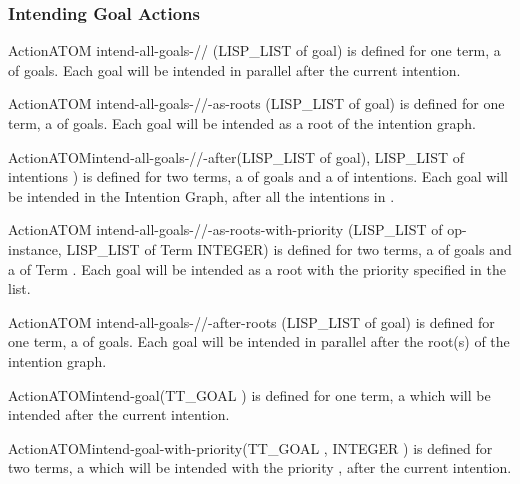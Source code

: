 \subsubsection{Intending Goal Actions}

\begin{typeefa}{Action}{ATOM} {intend-all-goals-//} {(LISP\_LIST of goal)}
is defined for one term, a  of goals. Each goal will be intended
in parallel after the current intention.
\end{typeefa}

\begin{typeefa}{Action}{ATOM} {intend-all-goals-//-as-roots} {(LISP\_LIST of
goal)}
is defined for one term, a  of goals.
Each goal will be intended as a root of the intention graph.
\end{typeefa}

\begin{typeefa}{Action}{ATOM}{intend-all-goals-//-after}{(LISP\_LIST of goal),
LISP\_LIST of intentions )} is defined for two terms, a  of
goals and  a  of intentions. Each goal will be intended in
the Intention Graph, after all the intentions in .
\end{typeefa}

\begin{typeefa}{Action}{ATOM} {intend-all-goals-//-as-roots-with-priority}
{(LISP\_LIST of op-instance, LISP\_LIST of Term INTEGER)} is defined for two
terms, a  of goals and a  of Term .  Each goal will be
intended as a root with the priority specified in the  list.
\end{typeefa}

\begin{typeefa}{Action}{ATOM} {intend-all-goals-//-after-roots} {(LISP\_LIST of
goal)} is defined for one term, a  of goals. Each goal will be intended
in parallel after the root(s) of the intention graph.
\end{typeefa}

\begin{typeefa}{Action}{ATOM}{intend-goal}{(TT\_GOAL )}
is defined for one term, a   which will be
intended after the current intention.
\end{typeefa}

\begin{typeefa}{Action}{ATOM}{intend-goal-with-priority}{(TT\_GOAL
, INTEGER )} is defined for two terms, a  
which will be intended with the priority , after the current
intention.
\end{typeefa}

